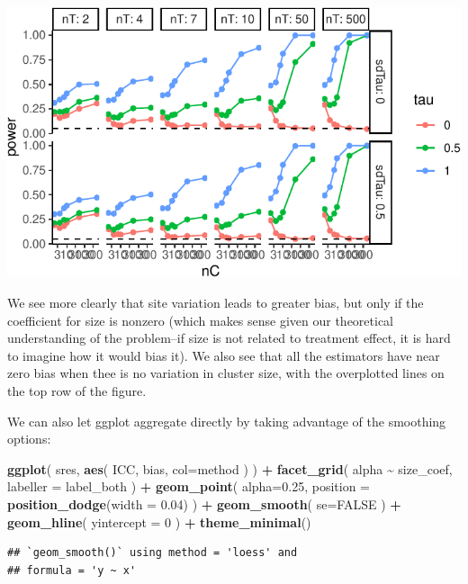 \documentclass[
]{book}
\newenvironment{Shaded}{\begin{snugshade}}{\end{snugshade}}
\newcommand{\AttributeTok}[1]{\textcolor[rgb]{0.13,0.29,0.53}{#1}}
\newcommand{\ConstantTok}[1]{\textcolor[rgb]{0.56,0.35,0.01}{#1}}
\newcommand{\DecValTok}[1]{\textcolor[rgb]{0.00,0.00,0.81}{#1}}
\newcommand{\FloatTok}[1]{\textcolor[rgb]{0.00,0.00,0.81}{#1}}
\newcommand{\FunctionTok}[1]{\textcolor[rgb]{0.13,0.29,0.53}{\textbf{#1}}}
\newcommand{\NormalTok}[1]{#1}
\newcommand{\SpecialCharTok}[1]{\textcolor[rgb]{0.81,0.36,0.00}{\textbf{#1}}}
\begin{document}
\begin{center}\includegraphics[width=0.75\linewidth]{Designing-Simulations-in-R_files/figure-latex/unnamed-chunk-159-1} \end{center}

We see more clearly that site variation leads to greater bias, but only if the coefficient for size is nonzero (which makes sense given our theoretical understanding of the problem--if size is not related to treatment effect, it is hard to imagine how it would bias it).
We also see that all the estimators have near zero bias when thee is no variation in cluster size, with the overplotted lines on the top row of the figure.

We can also let ggplot aggregate directly by taking advantage of the smoothing options:

\begin{Shaded}
\begin{Highlighting}[]
\FunctionTok{ggplot}\NormalTok{( sres, }\FunctionTok{aes}\NormalTok{( ICC, bias, }\AttributeTok{col=}\NormalTok{method ) ) }\SpecialCharTok{+}
  \FunctionTok{facet\_grid}\NormalTok{( alpha }\SpecialCharTok{\textasciitilde{}}\NormalTok{  size\_coef, }\AttributeTok{labeller =}\NormalTok{ label\_both ) }\SpecialCharTok{+}
    \FunctionTok{geom\_point}\NormalTok{( }\AttributeTok{alpha=}\FloatTok{0.25}\NormalTok{,}
              \AttributeTok{position =} \FunctionTok{position\_dodge}\NormalTok{(}\AttributeTok{width =} \FloatTok{0.04}\NormalTok{) ) }\SpecialCharTok{+}
  \FunctionTok{geom\_smooth}\NormalTok{( }\AttributeTok{se=}\ConstantTok{FALSE}\NormalTok{ ) }\SpecialCharTok{+} 
  \FunctionTok{geom\_hline}\NormalTok{( }\AttributeTok{yintercept =} \DecValTok{0}\NormalTok{ ) }\SpecialCharTok{+}
  \FunctionTok{theme\_minimal}\NormalTok{()}
\end{Highlighting}
\end{Shaded}

\begin{verbatim}
## `geom_smooth()` using method = 'loess' and
## formula = 'y ~ x'
\end{verbatim}
\end{document}

